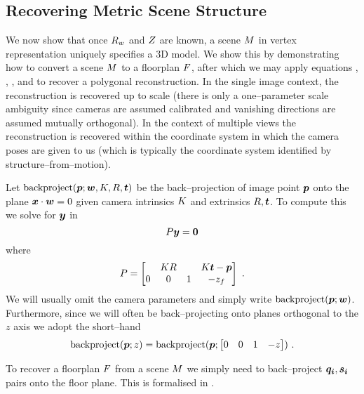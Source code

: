 \subsection{Recovering Metric Scene Structure}
\label{sec:metric-recovery}

We now show that once $\SceneR$ and $\Zs$ are known, a scene $\Scene$
in vertex representation uniquely specifies a 3D model. We show this
by demonstrating how to convert a scene $\Scene$ to a floorplan
$\Floorplan$, after which we may apply equations ,
, , and  to recover a polygonal
reconstruction. In the single image context, the reconstruction is
recovered up to scale (there is only a one--parameter scale
ambiguity since cameras are assumed calibrated and vanishing
directions are assumed mutually orthogonal). In the context of multiple
views the reconstruction is recovered within the coordinate system in
which the camera poses are given to us (which is typically the
coordinate system identified by structure--from--motion).\changedsinceviva

Let $\backproj(\Pixel;\vect{w},\CamMatrix,\CamR,\CamTr)$ be the
back--projection of image point $\Pixel$ onto the plane
$\vect{x}\cdot\vect{w}=0$ given camera intrinsics $\CamMatrix$ and
extrinsics $\CamR,\CamTr$. To compute this we solve for $\vect{y}$ in
\begin{equation}
  P \vect{y} = \vect{0}
\end{equation}
where
\begin{equation}
  P =
  \begin{bmatrix}
    & \CamMatrix\CamR & & \CamMatrix\CamTr-\Pixel \\
    0 & 0 & 1 & -\zfloor
  \end{bmatrix}~.
\end{equation}
We will usually omit the camera parameters and simply write
$\backproj(\Pixel;\vect{w})$. Furthermore, since we will often be
back--projecting onto planes orthogonal to the $z$ axis we adopt the
short--hand
\begin{equation}
  \backproj(\Pixel;z) = \backproj(\Pixel;
    \begin{bmatrix}0 & 0 & 1 & -z\end{bmatrix}) ~.
\end{equation}

To recover a floorplan $\Floorplan$ from a scene $\Scene$ we simply
need to back--project $\vect{q_i},\vect{s_i}$ pairs onto the floor
plane. This is formalised in .

